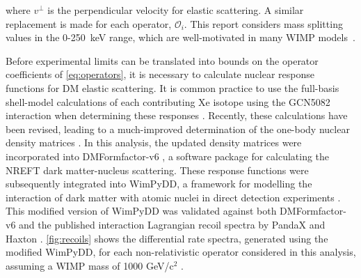 \documentclass[reprint, showpacs,
preprintnumbers,
amsmath,amssymb,
aps, floatfix,
superscriptaddress,
prd, nofootinbib]{revtex4-1}
\begin{document}
where $v^\perp$ is the perpendicular velocity for elastic scattering. 
A similar replacement is made for each operator, $\mathcal{O}_i$. 
This report considers mass splitting values in the 0-250~keV range, which are well-motivated in many WIMP models~\cite{Smith_2001, Barello_2014}.
\par
Before experimental limits can be translated into bounds on the operator coefficients of \autoref{eq:operators}, it is necessary to calculate nuclear response functions for DM elastic scattering. 
It is common practice to use the full-basis shell-model calculations of each contributing Xe isotope using the GCN5082 interaction when determining these responses \cite{MENENDEZ2009139}. 
Recently, these calculations have been revised, leading to a much-improved determination of the one-body nuclear density matrices \cite{haxton_unpublished}.
In this analysis, the updated density matrices were incorporated into DMFormfactor-v6 \cite{Anand:MathematicaEFT}, a software package for calculating the NREFT dark matter-nucleus scattering. 
These response functions were subsequently integrated into WimPyDD, a framework for modelling the interaction of dark matter with atomic nuclei in direct detection experiments \cite{Jeong_2022}. 
This modified version of WimPyDD was validated against both DMFormfactor-v6 and the published interaction Lagrangian recoil spectra by PandaX and Haxton \cite{PandaX2:SD_EFT_2019}.
\autoref{fig:recoils} shows the differential rate spectra, generated using the modified WimPyDD, for each non-relativistic operator considered in this analysis, assuming a WIMP mass of 1000 GeV/c$^2$ .
\end{document}
